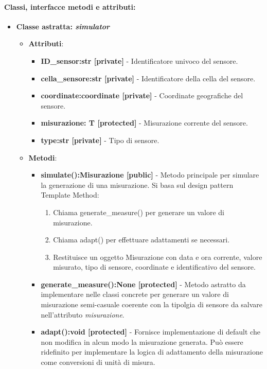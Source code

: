 \paragraph{Classi, interfacce metodi e attributi:}
\begin{itemize}
    \item {\textbf{Classe astratta: \textit{simulator}}}
        \begin{itemize}
            \item \textbf{Attributi}: 
            \begin{itemize}
                \item \textbf{ID\_sensor:str [private]} - Identificatore univoco del sensore.
                \item \textbf{cella\_sensore:str [private]} - Identificatore della cella del sensore.
                \item \textbf{coordinate:coordinate [private]} - Coordinate geografiche del sensore.
                \item \textbf{misurazione: T [protected]} - Misurazione corrente del sensore.
                \item \textbf{type:str [private]} - Tipo di sensore.
            \end{itemize}
            \item \textbf{Metodi}:
            \begin{itemize}
                \item \textbf{simulate():Misurazione [public]} - Metodo principale per simulare la generazione di una misurazione.
                Si basa sul design pattern Template Method:
                \begin{enumerate}
                    \item Chiama generate\_measure() per generare un valore di misurazione.
                    \item Chiama adapt() per effettuare adattamenti se necessari.
                    \item Restituisce un oggetto Misurazione con data e ora corrente, valore misurato, tipo di sensore, coordinate e identificativo del sensore.
                \end{enumerate}
                \item \textbf{generate\_measure():None [protected]} - Metodo astratto da implementare nelle classi concrete per generare un valore di misurazione semi-casuale coerente con la tipolgia di sensore da salvare nell'attributo \textit{misurazione}.
                \item \textbf{adapt():void [protected]} - Fornisce implementazione di default che non modifica in alcun modo la misurazione generata. Può essere ridefinito per implementare la logica di adattamento della misurazione come conversioni di unità di misura.

\end{itemize}
\end{itemize}
\end{itemize}

